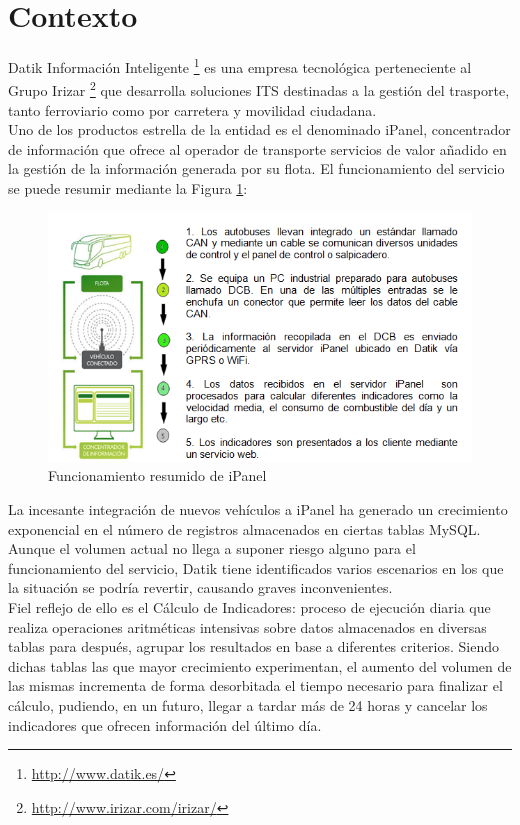 \section{Contexto}
 
Datik Información Inteligente \footnote{\url{http://www.datik.es/}} es una empresa tecnológica perteneciente al Grupo Irizar \footnote{\url{http://www.irizar.com/irizar/}}  que desarrolla soluciones ITS destinadas a la gestión del trasporte, tanto ferroviario como por carretera y movilidad ciudadana.\\

Uno de los productos estrella de la entidad es el denominado iPanel, concentrador de  información que ofrece al operador de transporte servicios de valor añadido en la gestión de la información generada por su flota. El funcionamiento del servicio se puede resumir mediante la Figura \ref{fig:ipanel}:\\

\begin{figure}[h]
	\centering
	\includegraphics[width=1\textwidth]{Ilustraciones/ipanel_infraesctructure.png}
	\caption{Funcionamiento resumido de iPanel}
	\label{fig:ipanel}
\end{figure}

La incesante integración de nuevos vehículos a iPanel ha generado un crecimiento exponencial en el número de registros almacenados en ciertas tablas MySQL. Aunque el volumen actual no llega a suponer riesgo alguno para el funcionamiento del servicio, Datik tiene identificados varios escenarios en los que la situación se podría revertir, causando graves inconvenientes.\\

Fiel reflejo de ello es el Cálculo de Indicadores: proceso de ejecución diaria que realiza operaciones aritméticas intensivas sobre datos almacenados en diversas tablas para después, agrupar los resultados en base a diferentes criterios. Siendo dichas tablas las que mayor crecimiento experimentan, el aumento del volumen de las mismas incrementa de forma desorbitada el tiempo necesario para finalizar el cálculo, pudiendo, en un futuro, llegar a tardar más de 24 horas y cancelar los indicadores que ofrecen información del último día.\\

